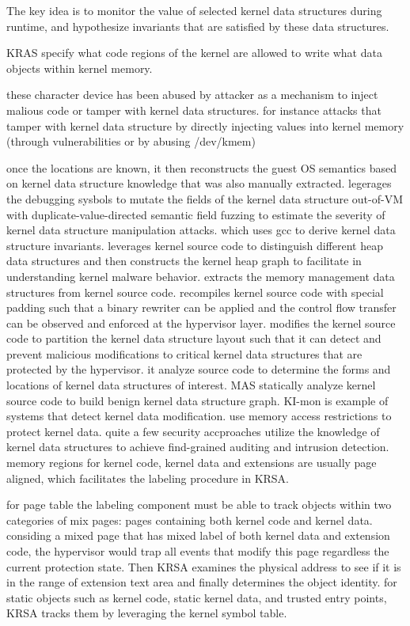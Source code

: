 \documentclass[conference]{IEEEtran}
\begin{document}
The key idea is to monitor the value of selected kernel data structures during runtime, and hypothesize invariants that are satisfied by these data structures. 

KRAS specify what code regions of the kernel are allowed to write what data objects within kernel memory. 

these character device has been abused by attacker as a mechanism to inject malious code or tamper with kernel data structures.
for instance attacks that tamper with kernel data structure by directly injecting values into kernel memory (through vulnerabilities or by abusing /dev/kmem)

once the locations are known, it then reconstructs the guest OS semantics based on kernel data structure knowledge that was also manually extracted. 
legerages the debugging sysbols to mutate the fields of the kernel data structure out-of-VM with duplicate-value-directed semantic field fuzzing to estimate the severity of kernel data structure manipulation attacks. 
which uses gcc to derive kernel data structure invariants. 
leverages kernel source code to distinguish different heap data structures and then constructs the kernel heap graph to facilitate in understanding kernel malware behavior. 
extracts the memory management data structures from kernel source code. 
recompiles kernel source code with special padding such that a binary rewriter can be applied and the control flow transfer can be observed and enforced at the hypervisor layer. 
modifies the kernel source code to partition the kernel data structure layout such that it can detect and prevent malicious modifications to critical kernel data structures that are protected by the hypervisor. 
it analyze source code to determine the forms and locations of kernel data structures of interest. 
MAS statically analyze kernel source code to build benign kernel data structure graph. 
KI-mon is example of systems that detect kernel data modification. 
use memory access restrictions to protect kernel data. 
quite a few security accproaches utilize the knowledge of kernel data structures to achieve find-grained auditing and intrusion detection.
memory regions for kernel code, kernel data and extensions are usually page aligned, which facilitates the labeling procedure in KRSA. 

for page table 
the labeling component must be able to track objects within two categories of mix pages: pages containing both kernel code and kernel data. 
considing a mixed page that has mixed label of both kernel data and extension code, the hypervisor would trap all events that modify this page regardless the current protection state. Then KRSA examines the physical address to see if it is in the range of extension text area and finally determines the object identity. 
for static objects such as kernel code, static kernel data, and trusted entry points, KRSA tracks them by leveraging the kernel symbol table. 
\end{document}

